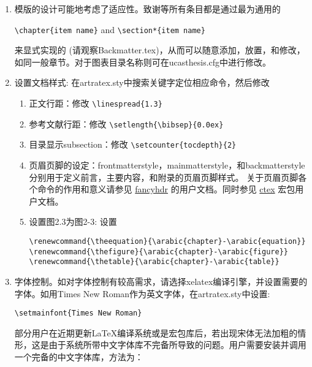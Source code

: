 \begin{enumerate}
    \item 模版的设计可能地考虑了适应性。致谢等所有条目都是通过最为通用的

        \verb+\chapter{item name}+  and \verb+\section*{item name}+

        来显式实现的 (请观察Backmatter.tex)，从而可以随意添加，放置，和修改，如同一般章节。对于图表目录名称则可在ucasthesis.cfg中进行修改。

    \item 设置文档样式: 在artratex.sty中搜索关键字定位相应命令，然后修改
        \begin{enumerate}
            \item 正文行距：修改 \verb|\linespread{1.3}|
            \item 参考文献行距：修改 \verb|\setlength{\bibsep}{0.0ex}|
            \item 目录显示subsection：修改 \verb|\setcounter{tocdepth}{2}|
            \item 页眉页脚的设定：frontmatterstyle，mainmatterstyle，和backmatterstyle分别用于定义前言，主要内容，和附录的页眉页脚样式。                关于页眉页脚各个命令的作用和意义请参见 \href{https://www.ctan.org/pkg/fancyhdr?lang=en}{fancyhdr} 的用户文档。同时参见 \href{https://ctan.org/pkg/ctex?lang=en}{ctex} 宏包用户文档。

            \item 设置图2.3为图2-3: 设置
                {
                    \footnotesize
\begin{verbatim}
\renewcommand{\theequation}{\arabic{chapter}-\arabic{equation}}
\renewcommand{\thefigure}{\arabic{chapter}-\arabic{figure}}
\renewcommand{\thetable}{\arabic{chapter}-\arabic{table}}
\end{verbatim}
                }
        \end{enumerate}

    \item 字体控制。如对字体控制有较高需求，请选择xelatex编译引擎，并设置需要的字体。如用Times New Roman作为英文字体，在artratex.sty中设置:

                 \verb|\setmainfont{Times New Roman}|

                 部分用户在近期更新\LaTeX{}编译系统或是宏包库后，若出现宋体无法加粗的情形，这是由于系统所带中文字体库不完备所导致的问题。用户需要安装并调用一个完备的中文字体库，方法为：


\end{enumerate}

